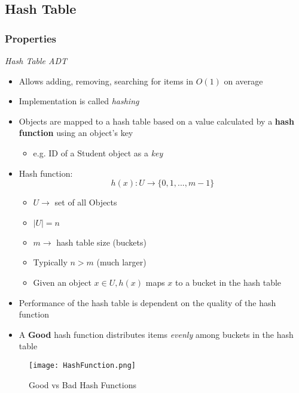\documentclass[10pt, 
a4paper, 
oneside, 
headinclude, footinclude, 
BCOR5mm]
{scrartcl}
\begin{document}
\newpage
\subsection{Hash Table}
\subsubsection{Properties}
\begin{definition}
    \textit{Hash Table ADT}
    \begin{itemize}
        \item Allows adding, removing, searching for items in $O(1)$ on average
        \item Implementation is called \textit{hashing}
        \item Objects are mapped to a hash table based on a value calculated by a \textbf{hash function}
        using an object's key
        \begin{itemize}
            \item e.g. ID of a Student object as a \textit{key}
        \end{itemize}
        \item Hash function: $$h(x): U \rightarrow \{0, 1, ..., m-1\}$$
        \begin{itemize}
            \item $U\rightarrow$ set of all Objects
            \item $|U| = n$
            \item $m\rightarrow$ hash table size (buckets)
            \item Typically $n>m$ (much larger)
            \item Given an object $x\in U,h(x)$ maps $x$ to a bucket in the hash table
        \end{itemize}
        \item Performance of the hash table is dependent on the quality of the hash function
        \item A \textbf{Good} hash function distributes items \textit{evenly} among buckets in the hash table
    \end{itemize}
\end{definition}
\begin{figure}[H]
    \begin{center}
        \texttt{[image: HashFunction.png]}
        \caption{Good vs Bad Hash Functions}
        \label{fig:hashfunc}
    \end{center}
\end{figure}
\end{document}
